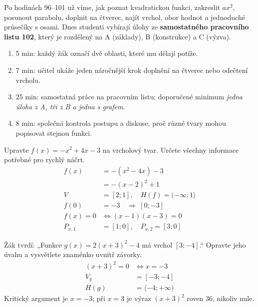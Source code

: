 \documentclass[11pt,a4paper]{article}
\begin{document}
Po hodinách 96–101 už víme, jak poznat kvadratickou funkci, zakreslit $ax^2$, posunout parabolu, doplnit na čtverec, najít vrchol, obor hodnot a jednoduché průsečíky s osami. Dnes studenti vybírají úlohy ze \textbf{samostatného pracovního listu 102}, který je rozdělený na A (základy), B (konstrukce) a C (výzva).
\begin{enumerate}[label=\arabic*.]
\item 5 min: každý žák označí dvě oblasti, které mu dělají potíže.
\item 7 min: učitel ukáže jeden náročnější krok doplnění na čtverec nebo odečtení vrcholu.
\item 25 min: samostatná práce na pracovním listu; doporučené minimum \emph{jedna úloha z A, tři z B a jedna s grafem}.
\item 8 min: společná kontrola postupu a diskuse, proč různé tvary mohou popisovat stejnou funkci.
\end{enumerate}

\begin{prikladReseniBox}[title={Příklad 1}]
Upravte $f(x)=-x^2+4x-3$ na vrcholový tvar. Určete všechny informace potřebné pro rychlý náčrt.
\tcblower
\[
\begin{aligned}
f(x)&=-(x^2-4x)-3 \\
&=-(x-2)^2+1 \\
V&=[2;1],\quad H(f)=(-\infty;1\rangle \\
f(0)&=-3\quad\Rightarrow\ [0;-3] \\
f(x)=0&\iff(x-1)(x-3)=0 \\
P_{x,1}&=[1;0],\quad P_{x,2}=[3;0]
\end{aligned}
\]

\end{prikladReseniBox}

\begin{zadaniReseniBox}[title={Samostatná práce 1}]
Žák tvrdí: „Funkce $g(x)=2(x+3)^2-4$ má vrchol $[3;-4]$.“ Opravte jeho úvahu a vysvětlete znaménko uvnitř závorky.
\tcblower
\[
\begin{aligned}
(x+3)^2=0&\iff x=-3 \\
V_g&=[-3;-4] \\
H(g)&=\langle-4;+\infty)
\end{aligned}
\]
Kritický argument je $x=-3$; při $x=3$ je výraz $(x+3)^2$ roven $36$, nikoliv nule.
\end{zadaniReseniBox}
\end{document}
